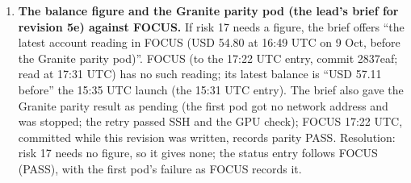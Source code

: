\documentclass{article}
\theoremstyle{plain}
\theoremstyle{definition}
\theoremstyle{remark}
\begin{document}
\begin{enumerate}
        mean that is still too close goes to the user.
  \item \textbf{The balance figure and the Granite parity pod (the lead's brief
        for revision 5e) against FOCUS.} If risk 17 needs a figure, the brief
        offers ``the latest account reading in FOCUS (USD 54.80 at 16:49 UTC on
        9 Oct, before the Granite parity pod)''. FOCUS (to the 17:22 UTC entry,
        commit 2837eaf; read at 17:31 UTC) has no such reading; its latest
        balance is ``USD 57.11 before'' the 15:35 UTC launch (the 15:31 UTC
        entry). The brief also gave the Granite parity result as pending (the
        first pod got no network address and was stopped; the retry passed SSH
        and the GPU check); FOCUS 17:22 UTC, committed while this revision was
        written, records parity PASS. Resolution: risk 17 needs no figure, so it
        gives none; the status entry follows FOCUS (PASS), with the first pod's
        failure as FOCUS records it.
\end{enumerate}
\end{document}
